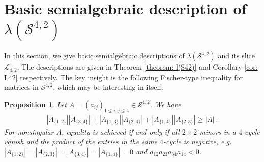\documentclass[reqno,hidelinks,11pt]{amsart}
\numberwithin{equation}{section}
\newtheorem{proposition}[theorem]{Proposition}
\def\S{\mathcal{S}}
\begin{document}
\section{Basic semialgebraic description of \texorpdfstring{$\lambda(\mathcal{S}^{4,2})$}{lambda(S4,2)} } \label{section: 2-locally psd}

In this section, we give basic semialgebraic descriptions of $\lambda(\S^{4, 2})$ and its slice $\mathcal{L}_{4, 2}$. The descriptions are given in Theorem \ref{theorem: l(S42)} and Corollary \ref{cor: L42} respectively. The key insight is the following Fischer-type inequality for matrices in $\S^{4,2}$, which may be interesting in itself.

\begin{proposition}\label{proposition: 2-local Fischer}
    Let $A=(a_{ij})_{1 \leq i,j \leq 4} \in \S^{4, 2}$. We have
    \begin{align*}
       |A_{\{1, 2\}}| |A_{\{3, 4\}}|+ |A_{\{1, 3\}}| |A_{\{2, 4\}}|+ |A_{\{1, 4\}}||A_{\{2, 3\}}| \ge |A|~.
    \end{align*}
    For nonsingular $A$, equality is achieved if and only if all $2\times2$ minors in a $4$-cycle vanish and the product of the entries in the same $4$-cycle is negative, e.g. $|A_{\{1,2\}}|=|A_{\{2, 3\}}|=|A_{\{3, 4\}}|=|A_{\{1,4\}}|=0$ and $a_{12}a_{23}a_{34}a_{14}<0$.
\end{proposition}
\end{document}
